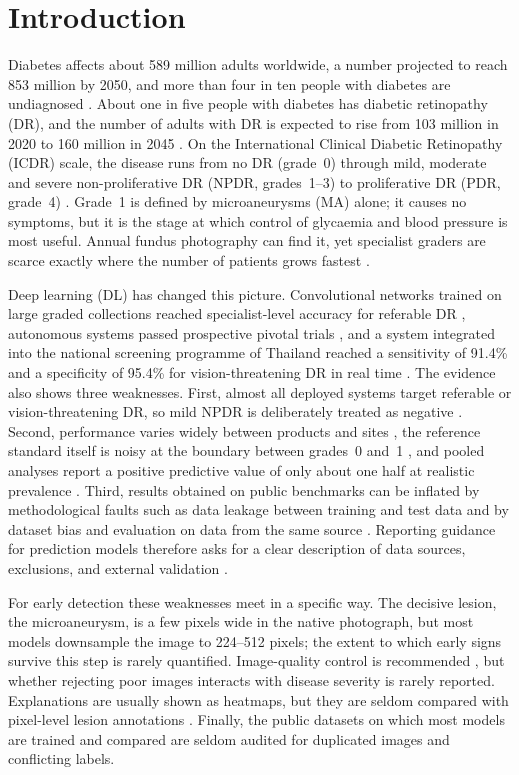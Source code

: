 \section{Introduction}
Diabetes affects about 589 million adults worldwide, a number projected to reach 853 million by 2050, and more than four in ten people with diabetes are undiagnosed \cite{idf2025}. About one in five people with diabetes has diabetic retinopathy (DR), and the number of adults with DR is expected to rise from 103 million in 2020 to 160 million in 2045 \cite{teo2021}. On the International Clinical Diabetic Retinopathy (ICDR) scale, the disease runs from no DR (grade~0) through mild, moderate and severe non-proliferative DR (NPDR, grades~1--3) to proliferative DR (PDR, grade~4) \cite{wilkinson2003}. Grade~1 is defined by microaneurysms (MA) alone; it causes no symptoms, but it is the stage at which control of glycaemia and blood pressure is most useful. Annual fundus photography can find it, yet specialist graders are scarce exactly where the number of patients grows fastest \cite{idf2025}.

Deep learning (DL) has changed this picture. Convolutional networks trained on large graded collections reached specialist-level accuracy for referable DR \cite{gulshan2016,ting2017}, autonomous systems passed prospective pivotal trials \cite{abramoff2018,ipp2021}, and a system integrated into the national screening programme of Thailand reached a sensitivity of 91.4\% and a specificity of 95.4\% for vision-threatening DR in real time \cite{ruamviboonsuk2022}. The evidence also shows three weaknesses. First, almost all deployed systems target referable or vision-threatening DR, so mild NPDR is deliberately treated as negative \cite{gulshan2016,ipp2021,ruamviboonsuk2022}. Second, performance varies widely between products and sites \cite{lee2021,wang2026}, the reference standard itself is noisy at the boundary between grades~0 and~1 \cite{krause2018}, and pooled analyses report a positive predictive value of only about one half at realistic prevalence \cite{wewetzer2021}. Third, results obtained on public benchmarks can be inflated by methodological faults such as data leakage between training and test data \cite{kapoor2023} and by dataset bias and evaluation on data from the same source \cite{varoquaux2022}. Reporting guidance for prediction models therefore asks for a clear description of data sources, exclusions, and external validation \cite{collins2024}.

For early detection these weaknesses meet in a specific way. The decisive lesion, the microaneurysm, is a few pixels wide in the native photograph, but most models downsample the image to 224--512 pixels; the extent to which early signs survive this step is rarely quantified. Image-quality control is recommended \cite{dai2021,ruamviboonsuk2022}, but whether rejecting poor images interacts with disease severity is rarely reported. Explanations are usually shown as heatmaps, but they are seldom compared with pixel-level lesion annotations \cite{sayres2019}. Finally, the public datasets on which most models are trained and compared are seldom audited for duplicated images and conflicting labels.


